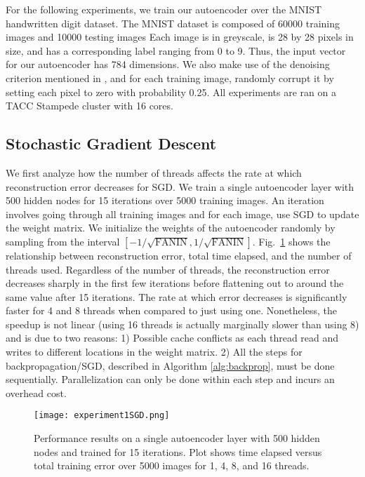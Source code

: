 \FloatBarrier

For the following experiments, we train our autoencoder over the MNIST handwritten digit
dataset. The MNIST dataset is composed of 60000 training images and 10000
testing images Each image is in greyscale, is 28 by 28 pixels in size, and has
a corresponding label ranging from 0 to 9. Thus, the input vector for our
autoencoder has 784 dimensions. We also make use of the denoising criterion
mentioned in \cite{vincent2010stacked}, and for each training image, randomly
corrupt it by setting each pixel to zero with probability 0.25. All experiments are ran on a TACC Stampede cluster with 16 cores. 

\subsection{Stochastic Gradient Descent}

We first analyze how the number of threads affects the rate at which reconstruction
error decreases for SGD. We train a single autoencoder layer with 500 hidden nodes for
15 iterations over 5000 training images. An iteration involves going through
all training images and for each image, use SGD to update the weight matrix. We initialize the weights of the autoencoder randomly by sampling from the interval $[-1/\sqrt{\text{FANIN}}, 1/\sqrt{\text{FANIN}}]$.
Fig.~\ref{fig:experiment1} shows the relationship between reconstruction error, total
time elapsed, and the number of threads used. Regardless of the number of
threads, the reconstruction error decreases sharply in the first few iterations
before flattening out to around the same value after 15 iterations. The rate at
which error decreases is significantly faster for 4 and 8 threads when
compared to just using one. Nonetheless, the speedup is not linear (using 16 threads is actually marginally slower than using 8) and is due
to two reasons: 1) Possible cache conflicts as each thread read and writes to
different locations in the weight matrix. 2) All the steps for
backpropagation/SGD, described in Algorithm \ref{alg:backprop}, must be done
sequentially. Parallelization can only be done within each step and incurs an
overhead cost.

\begin{figure}[h]
\centering
\texttt{[image: experiment1SGD.png]}
\caption{Performance results on a single autoencoder layer with 500 hidden nodes and trained for 15 iterations. Plot shows time elapsed versus total training error over 5000 images for 1, 4, 8, and 16 threads.}
\label{fig:experiment1}
\end{figure}


